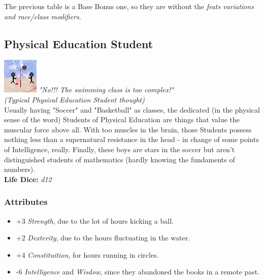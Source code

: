 \documentclass[ letterpaper,12pt]{article}
\begin{document}
The previous table is a Base Bonus one, so they are without the {\it feats variations and race/class modifiers}.\\

\subsection{Physical Education Student}
\includegraphics{../data/classes/Img/edfisica.png}
{\it "No!!! The swimming class is too complex!"\\(Typical Physical Education Student thought)}\\

Usually having "Soccer" and "Basketball" as classes, the dedicated (in the physical sense of the word) Students of Physical Education are things that value the muscular force above all.  With too muscles in the brain, those Students possess nothing less than a supernatural resistance in the head - in change of some points of Intelligence, really.  Finally, these boys are stars in the soccer but aren't distinguished students of mathematics (hardly knowing the fundaments of numbers).\\

{\bf Life Dice:} {\it d12}

\subsubsection{Attributes}
\begin{itemize}
\item{+3 {\it Strength}, due to the lot of hours kicking a ball.}
\item{+2 {\it Dexterity}, due to the hours fluctuating in the water.}
\item{+4 {\it Constituition}, for hours running in circles.}
\item{-6 {\it Intelligence} and {\it Wisdow}, since they abandoned the books in a remote past.}
\end{itemize}
\end{document}
